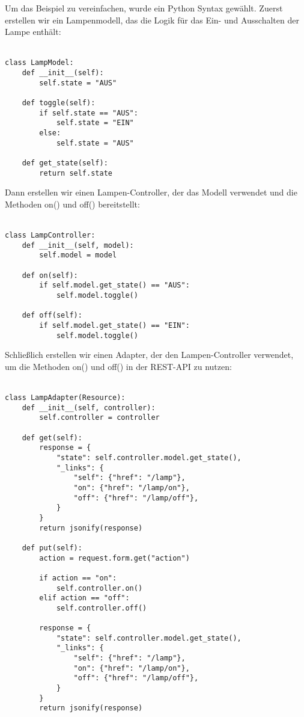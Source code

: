 \documentclass[../vs-script-first-v01.tex]{subfiles}
\begin{document}
Um das Beispiel zu vereinfachen, wurde ein Python Syntax gewählt. Zuerst erstellen wir ein Lampenmodell, das die Logik für das Ein- und Ausschalten der Lampe enthält:\\\\
\noindent\begin{minipage}{\textwidth}
\begin{lstlisting}[caption={LampModel},captionpos=b,label={lst:lamp_m}]
class LampModel:
    def __init__(self):
        self.state = "AUS"

    def toggle(self):
        if self.state == "AUS":
            self.state = "EIN"
        else:
            self.state = "AUS"

    def get_state(self):
        return self.state

\end{lstlisting}
\end{minipage}
Dann erstellen wir einen Lampen-Controller, der das Modell verwendet und die Methoden on() und off() bereitstellt:\\\\
\noindent\begin{minipage}{\textwidth}
\begin{lstlisting}[caption={LampController},captionpos=b,label={lst:lamp_c}]
class LampController:
    def __init__(self, model):
        self.model = model

    def on(self):
        if self.model.get_state() == "AUS":
            self.model.toggle()

    def off(self):
        if self.model.get_state() == "EIN":
            self.model.toggle()
\end{lstlisting}
\end{minipage}
Schließlich erstellen wir einen Adapter, der den Lampen-Controller verwendet, um die Methoden on() und off() in der REST-API zu nutzen:\\\\
\begin{lstlisting}[caption={LampAdapter},captionpos=b,label={lst:lamp_a}]
class LampAdapter(Resource):
    def __init__(self, controller):
        self.controller = controller

    def get(self):
        response = {
            "state": self.controller.model.get_state(),
            "_links": {
                "self": {"href": "/lamp"},
                "on": {"href": "/lamp/on"},
                "off": {"href": "/lamp/off"},
            }
        }
        return jsonify(response)

    def put(self):
        action = request.form.get("action")

        if action == "on":
            self.controller.on()
        elif action == "off":
            self.controller.off()

        response = {
            "state": self.controller.model.get_state(),
            "_links": {
                "self": {"href": "/lamp"},
                "on": {"href": "/lamp/on"},
                "off": {"href": "/lamp/off"},
            }
        }
        return jsonify(response)
\end{lstlisting}
\end{document}
